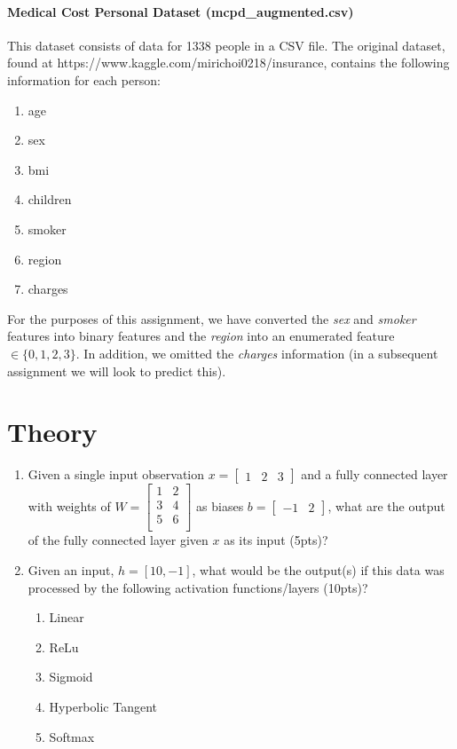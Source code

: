 \documentclass[12pt]{article}
\begin{document}
\paragraph{Medical Cost Personal Dataset  (mcpd\_augmented.csv)}
This dataset consists of data for 1338 people in a CSV file.  The original dataset, found at https://www.kaggle.com/mirichoi0218/insurance, contains the following information for each person:

\begin{enumerate}
\item age
\item sex
\item bmi
\item children
\item smoker
\item region
\item charges
\end{enumerate}

\noindent
For the purposes of this assignment, we have converted the \emph{sex} and \emph{smoker} features into binary features and the \emph{region} into an enumerated feature $\in \{0,1,2,3\}$.   In addition, we omitted the \emph{charges} information (in a subsequent assignment we will look to predict this).


\newpage
\section{Theory}
\begin{enumerate}
\item Given a single input observation $x=\begin{bmatrix}1 & 2 &3\end{bmatrix}$ and a fully connected layer with weights of $W=\begin{bmatrix}
1 & 2\\
3 & 4\\
5 & 6\\
\end{bmatrix}$  as biases $b=\begin{bmatrix}-1 & 2\end{bmatrix}$, what are the output of the fully connected layer given $x$ as its input (5pts)?

\item Given an input, $h=[10,-1]$, what would be the output(s) if this data was processed by the following activation functions/layers (10pts)? 
\begin{enumerate}
\item Linear
\item ReLu
\item Sigmoid
\item Hyperbolic Tangent
\item Softmax
\end{enumerate}

\end{enumerate}
\end{document}
